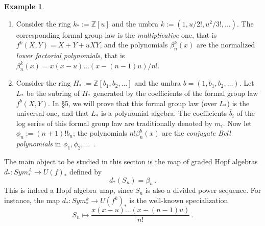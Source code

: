 \documentclass[a4paper,12pt]{amsart}
\theoremstyle{definition}
\newtheorem{exa}[equation]{Example}
\numberwithin{equation}{section}
\newcommand{\bZ}{{\mathbb Z}}
\newcommand{\bb}[1]{\mbox{$\beta_{#1}^{b}(x)$}}
\newcommand{\has}{Hopf algebra}
\newcommand{\hap}{Hopf algebras}
\newcommand{\sua}{Sym_*^A }
\begin{document}
\begin{exa}\label{exfgl}\hfill{\rm
\begin{enumerate}
\item Consider the ring $k_*:=\bZ[u]$ and the umbra $k:=(1,u/2!,u^2/3!,\ldots)$. The corresponding formal group law is the {\em multiplicative} one, that is $f^k(X,Y)=X+Y+uXY$, and the polynomials $\beta_n^k(x)$ are the normalized {\em lower factorial polynomials}, that is $\beta_n^k(x)=x(x-u)\ldots (x-(n-1)u)/n!$.
\item Consider the ring $H_*:=\bZ[b_1,b_2,\ldots]$ and the umbra $b=(1,b_1,b_2,\ldots)$. Let $L_*$ be the subring of $H_*$ generated by the coefficients of the formal group law $f^b(X,Y)$. In \S5, we will prove that this formal group law (over $L_*$) is the universal one, and that $L_*$ is a polynomial algebra. The coefficients $\overline{b}_i$ of the log series of this formal group law are traditionally denoted by $m_i$. Now let $\phi_n:=(n+1)!b_n$; the polynomials $n!\bb{n}$ are the {\em conjugate Bell polynomials} in $\phi_1,\phi_2,\ldots\;\,$.
\end{enumerate}}
\end{exa} 

The main object to be studied in this section is the map of graded \hap\
$d_*\colon\sua\rightarrow U(f)_*$ defined by
\begin{equation}d_*(S_n)=\beta_n\,.
\end{equation}
This is indeed a \has\ map, since $S_n$ is also a divided power sequence. For instance, the map $d_*\colon Sym_*^k\rightarrow U(f^k)_*$ is the well-known specialization
\[S_n\mapsto\frac{x(x-u)\ldots (x-(n-1)u)}{n!}\,.\]
\end{document}
